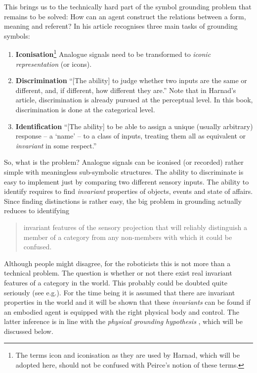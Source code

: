 

This brings us to the technically hard part of the symbol grounding problem that remains to be solved: How can an agent construct the relations between a form, meaning and referent? In his article \citet{harnad:1990} recognises three main tasks of grounding symbols:

\begin{enumerate}
\item {\bf Iconisation}\footnote{The terms icon and iconisation as they are used by Harnad, which will be adopted here, should not be confused with Peirce's notion of these terms.} Analogue signals need to be transformed to {\em iconic representation} (or icons).
\item {\bf Discrimination} ``[The ability] to judge whether two inputs are the same or different, and, if different, how different they are.'' Note that in Harnad's article, discrimination is already pursued at the perceptual level. In this book, discrimination is done at the categorical level.
\item {\bf Identification} ``[The ability] to be able to assign a unique (usually arbitrary) response -- a `name' -- to a class of inputs, treating them all as equivalent or {\em invariant} in some respect.'' \cite[my italics]{harnad:1990}
\end{enumerate}


So, what is the problem? Analogue signals can be iconised (or recorded) rather simple with meaningless sub-symbolic structures. The ability to discriminate is easy to implement just by comparing two different sensory inputs. The ability to identify requires to find {\em invariant} properties of objects, events and state of affairs. Since finding distinctions is rather easy, the big problem in grounding actually reduces to identifying

\begin{quote}
invariant features of the sensory projection that will reliably distinguish a member of  a category from any non-members with which it could be confused. \citep{harnad:1990}
\end{quote}

Although people might disagree, for the roboticists this is not more than a technical problem. The question is whether or not there exist real invariant features of a category in the world. This probably could be doubted quite seriously (see e.g.\citealt{harnad:1993}). For the time being it is assumed that there are invariant properties in the world and it will be shown that these {\em invariants} can be found if an embodied agent is equipped with the right physical body and control. The latter inference is in line with the {\em physical grounding hypothesis} \citep{brooks:1990}, which will be discussed below.

